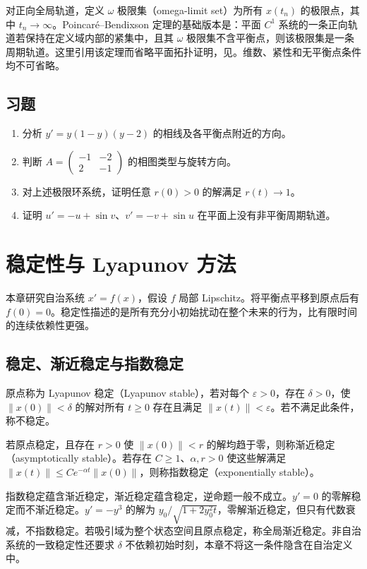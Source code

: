 \documentclass[UTF8,12pt,a4paper,fontset=fandol]{ctexbook}
\begin{document}
对正向全局轨道，定义 $\omega$ 极限集（omega-limit set）为所有 $x(t_n)$ 的极限点，其中 $t_n\to\infty$。Poincaré--Bendixson 定理的基础版本是：平面 $C^1$ 系统的一条正向轨道若保持在定义域内部的紧集中，且其 $\omega$ 极限集不含平衡点，则该极限集是一条周期轨道。这里引用该定理而省略平面拓扑证明，见\cite[第7章]{teschl-ode}。维数、紧性和无平衡点条件均不可省略。

\section{习题}
\begin{enumerate}
 \item\label{ex:ode-phase} 分析 $y'=y(1-y)(y-2)$ 的相线及各平衡点附近的方向。
 \item\label{ex:ode-spiral} 判断 $A=\begin{pmatrix}-1&-2\\2&-1\end{pmatrix}$ 的相图类型与旋转方向。
 \item 对上述极限环系统，证明任意 $r(0)>0$ 的解满足 $r(t)\to1$。
 \item 证明 $u'=-u+\sin v$、$v'=-v+\sin u$ 在平面上没有非平衡周期轨道。
\end{enumerate}

\chapter{稳定性与 Lyapunov 方法}
\label{chap:ode-stability}

本章研究自治系统 $x'=f(x)$，假设 $f$ 局部 Lipschitz。将平衡点平移到原点后有 $f(0)=0$。稳定性描述的是所有充分小初始扰动在整个未来的行为，比有限时间的连续依赖性更强。

\section{稳定、渐近稳定与指数稳定}
\begin{definition}
原点称为 Lyapunov 稳定（Lyapunov stable），若对每个 $\varepsilon>0$，存在 $\delta>0$，使 $\|x(0)\|<\delta$ 的解对所有 $t\geq0$ 存在且满足 $\|x(t)\|<\varepsilon$。若不满足此条件，称不稳定。

若原点稳定，且存在 $r>0$ 使 $\|x(0)\|<r$ 的解均趋于零，则称渐近稳定（asymptotically stable）。若存在 $C\geq1$、$\alpha,r>0$ 使这些解满足 $\|x(t)\|\leq Ce^{-\alpha t}\|x(0)\|$，则称指数稳定（exponentially stable）。
\end{definition}

指数稳定蕴含渐近稳定，渐近稳定蕴含稳定，逆命题一般不成立。$y'=0$ 的零解稳定而不渐近稳定。$y'=-y^3$ 的解为 $y_0/\sqrt{1+2y_0^2t}$，零解渐近稳定，但只有代数衰减，不指数稳定。若吸引域为整个状态空间且原点稳定，称全局渐近稳定。非自治系统的一致稳定性还要求 $\delta$ 不依赖初始时刻，本章不将这一条件隐含在自治定义中。
\end{document}
